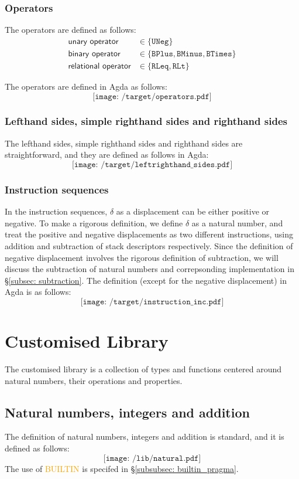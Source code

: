\documentclass[12pt,twoside,a4paper]{report}
\theoremstyle{definition}
\theoremstyle{definition}
\theoremstyle{definition}
\theoremstyle{definition}
\newcommand{\secref}[1]{\S\ref{#1}}
\newcommand{\og}[1]{\textcolor{orange}{#1}}
\begin{document}
    \subsubsection{Operators}
    The operators are defined as follows:
    \[\begin{aligned}
        \textsf{unary operator} &\in \{\texttt{UNeg}\} \\
        \textsf{binary operator} &\in \{\texttt{BPlus}, \texttt{BMinus}, \texttt{BTimes}\} \\
        \textsf{relational operator} &\in \{\texttt{RLeq}, \texttt{RLt}\}
    \end{aligned}\]

    The operators are defined in Agda as follows:
    \[\texttt{[image: /target/operators.pdf]}\]

    \subsubsection{Lefthand sides, simple righthand sides and righthand sides}
    The lefthand sides, simple righthand sides and righthand sides are straightforward, and they are defined as follows in Agda:
    \[\texttt{[image: /target/leftrighthand\_sides.pdf]}\]

    \subsubsection{Instruction sequences}
    In the instruction sequences, $\delta$ as a displacement can be either positive or negative. To make a rigorous definition, we define $\delta$ as a natural number, and treat the positive and negative displacements as two different instructions, using addition and subtraction of stack descriptors respectively. Since the definition of negative displacement involves the rigorous definition of subtraction, we will discuss the subtraction of natural numbers and correpsonding implementation in \secref{subsec: subtraction}. The definition (except for the negative displacement) in Agda is as follows:
    \[\texttt{[image: /target/instruction\_inc.pdf]}\]


    \section{Customised Library}
    The customised library is a collection of types and functions centered around natural numbers, their operations and properties. 

    \subsection{Natural numbers, integers and addition} \label{subsec: natural_numbers}
    The definition of natural numbers, integers and addition is standard, and it is defined as follows:
    \[\texttt{[image: /lib/natural.pdf]}\]
    The use of \og{\textsf{BUILTIN}} is specifed in \secref{subsubsec: builtin_pragma}.
\end{document}
